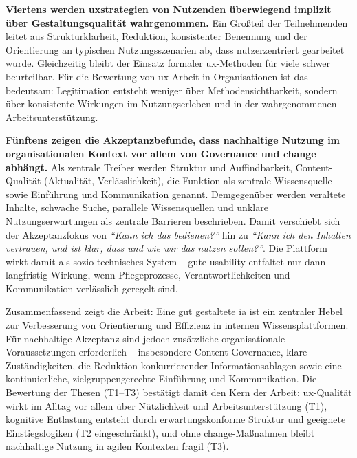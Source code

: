 \textbf{Viertens werden \Gls{uxstrategien} von Nutzenden überwiegend implizit über Gestaltungsqualität wahrgenommen.} Ein Großteil der Teilnehmenden leitet aus Strukturklarheit, Reduktion, konsistenter Benennung und der Orientierung an typischen Nutzungsszenarien ab, dass nutzerzentriert gearbeitet wurde. Gleichzeitig bleibt der Einsatz formaler \Gls{ux}-Methoden für viele schwer beurteilbar. Für die Bewertung von \Gls{ux}-Arbeit in Organisationen ist das bedeutsam: Legitimation entsteht weniger über Methodensichtbarkeit, sondern über konsistente Wirkungen im Nutzungserleben und in der wahrgenommenen Arbeitsunterstützung.

\textbf{Fünftens zeigen die Akzeptanzbefunde, dass nachhaltige Nutzung im organisationalen Kontext vor allem von Governance und \Gls{change} abhängt.} Als zentrale Treiber werden Struktur und Auffindbarkeit, Content-Qualität (Aktualität, Verlässlichkeit), die Funktion als zentrale Wissensquelle sowie Einführung und Kommunikation genannt. Demgegenüber werden veraltete Inhalte, schwache Suche, parallele Wissensquellen und unklare Nutzungserwartungen als zentrale Barrieren beschrieben. Damit verschiebt sich der Akzeptanzfokus von \textit{\enquote{Kann ich das bedienen?}} hin zu \textit{\enquote{Kann ich den Inhalten vertrauen, und ist klar, dass und wie wir das nutzen sollen?}}. Die Plattform wirkt damit als sozio-technisches System -- gute \Gls{usability} entfaltet nur dann langfristig Wirkung, wenn Pflegeprozesse, Verantwortlichkeiten und Kommunikation verlässlich geregelt sind.

Zusammenfassend zeigt die Arbeit: Eine gut gestaltete \Gls{ia} ist ein zentraler Hebel zur Verbesserung von Orientierung und Effizienz in internen Wissensplattformen. Für nachhaltige Akzeptanz sind jedoch zusätzliche organisationale Voraussetzungen erforderlich -- insbesondere Content-Governance, klare Zuständigkeiten, die Reduktion konkurrierender Informationsablagen sowie eine kontinuierliche, zielgruppengerechte Einführung und Kommunikation. Die Bewertung der Thesen (T1--T3) bestätigt damit den Kern der Arbeit: \Gls{ux}-Qualität wirkt im Alltag vor allem über Nützlichkeit und Arbeitsunterstützung (T1), kognitive Entlastung entsteht durch erwartungskonforme Struktur und geeignete Einstiegslogiken (T2 eingeschränkt), und ohne \Gls{change}-Maßnahmen bleibt nachhaltige Nutzung in agilen Kontexten fragil (T3).
